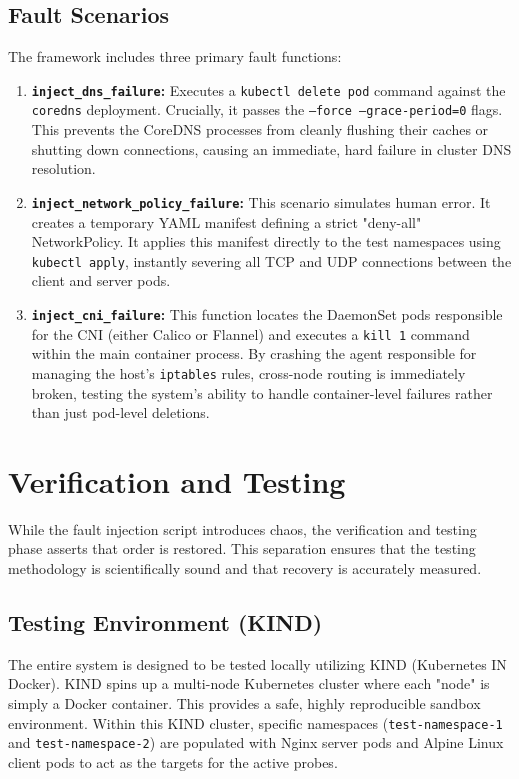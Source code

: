 \documentclass[12pt,a4paper]{article}
\begin{document}
\subsection{Fault Scenarios}
The framework includes three primary fault functions:
\begin{enumerate}
    \item \textbf{\texttt{inject\_dns\_failure}:} Executes a \texttt{kubectl delete pod} command against the \texttt{coredns} deployment. Crucially, it passes the \texttt{--force --grace-period=0} flags. This prevents the CoreDNS processes from cleanly flushing their caches or shutting down connections, causing an immediate, hard failure in cluster DNS resolution.
    \item \textbf{\texttt{inject\_network\_policy\_failure}:} This scenario simulates human error. It creates a temporary YAML manifest defining a strict "deny-all" NetworkPolicy. It applies this manifest directly to the test namespaces using \texttt{kubectl apply}, instantly severing all TCP and UDP connections between the client and server pods.
    \item \textbf{\texttt{inject\_cni\_failure}:} This function locates the DaemonSet pods responsible for the CNI (either Calico or Flannel) and executes a \texttt{kill 1} command within the main container process. By crashing the agent responsible for managing the host's \texttt{iptables} rules, cross-node routing is immediately broken, testing the system's ability to handle container-level failures rather than just pod-level deletions.
\end{enumerate}

\newpage

\section{Verification and Testing}
\onehalfspacing
While the fault injection script introduces chaos, the verification and testing phase asserts that order is restored. This separation ensures that the testing methodology is scientifically sound and that recovery is accurately measured.

\subsection{Testing Environment (KIND)}
The entire system is designed to be tested locally utilizing KIND (Kubernetes IN Docker). KIND spins up a multi-node Kubernetes cluster where each "node" is simply a Docker container. This provides a safe, highly reproducible sandbox environment. Within this KIND cluster, specific namespaces (\texttt{test-namespace-1} and \texttt{test-namespace-2}) are populated with Nginx server pods and Alpine Linux client pods to act as the targets for the active probes.
\end{document}
